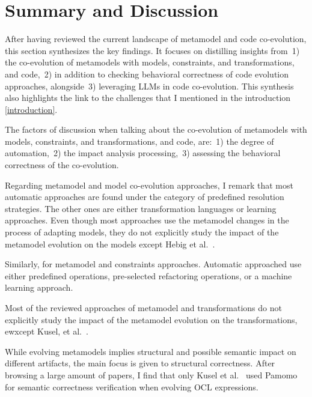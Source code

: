   \section{Summary and Discussion}
 \label{sotadiscuss}
  After having reviewed the current landscape of metamodel and code co-evolution, this section synthesizes the key findings. It focuses on distilling insights from~1) the co-evolution of metamodels with models, constraints, and transformations, and code,~2) in addition to checking behavioral correctness of code evolution approaches, alongside~3) leveraging LLMs in code co-evolution. This synthesis also highlights the link to the challenges that I mentioned in the introduction \ref{introduction}.
  
  The factors of discussion when talking about the co-evolution of metamodels with models, constraints, and transformations, and code, are:~1) the degree of automation,~2) the impact analysis processing,~3) assessing the behavioral correctness of the co-evolution.
  
  Regarding metamodel and model co-evolution approaches, I remark that most automatic approaches are found under the category of predefined resolution strategies. The other ones are either transformation languages or learning approaches. Even though most approaches use the metamodel changes in the process of adapting models, they do not explicitly study the impact of the metamodel evolution on the models except Hebig et al.~\cite{hebig2016approaches}.
  
  Similarly, for metamodel and constraints approaches.
  Automatic approached use either predefined operations, pre-selected refactoring operations, or a machine learning approach.
  
 
  Most of the reviewed approaches of metamodel and transformations do not explicitly study the impact of the metamodel evolution on the transformations, ewxcept Kusel, et al.~\cite{kusel2015consistent}.
  
  While evolving metamodels implies structural and possible semantic impact on different artifacts, the main focus is given to structural correctness. After browsing a large amount of papers, I find that only Kusel et al.~\cite{kusel2015systematic} used Pamomo~\cite{10.1007/s10515-012-0102-y} for semantic correctness verification when evolving OCL expressions.
  
